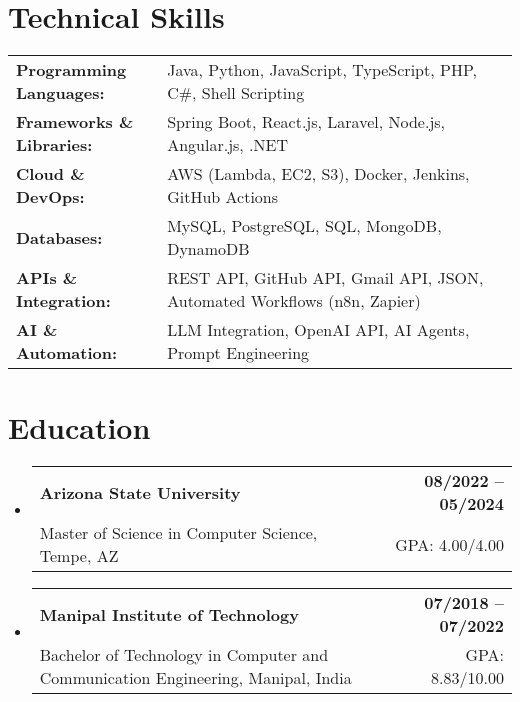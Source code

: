 \documentclass[letterpaper,11pt]{article}
\makeatletter
\newcommand{\educationSubheading}[4]{
  \vspace{-2pt}\item
    \begin{tabular*}{1.0\textwidth}[t]{l@{\extracolsep{\fill}}r}
      \textbf{\small #1} & \textbf{\small #2} \\
      {\small#3} & {\small #4} \\
    \end{tabular*}\vspace{-7pt}
}
\newcommand{\resumeSubHeadingListStart}{\begin{itemize}[leftmargin=0pt, label={}]}
\newcommand{\resumeSubHeadingListEnd}{\end{itemize}}
\makeatother
\begin{document}
\section{Technical Skills}
        \vspace{-14pt}
        \begin{table}[h]
            \footnotesize
            \begin{tabular}{p{0.3\linewidth} p{0.7\linewidth}}
                \textbf{Programming Languages:} & Java, Python, JavaScript, TypeScript, PHP, C\#, Shell Scripting \\
                \textbf{Frameworks \& Libraries:} & Spring Boot, React.js, Laravel, Node.js, Angular.js, .NET \\
                \textbf{Cloud \& DevOps:} & AWS (Lambda, EC2, S3), Docker, Jenkins, GitHub Actions \\
                \textbf{Databases:} & MySQL, PostgreSQL, SQL, MongoDB, DynamoDB \\
                \textbf{APIs \& Integration:} & REST API, GitHub API, Gmail API, JSON, Automated Workflows (n8n, Zapier) \\
                \textbf{AI \& Automation:} & LLM Integration, OpenAI API, AI Agents, Prompt Engineering \\
            \end{tabular}
        \end{table}

 \vspace{-15pt}

\section{Education}
  \resumeSubHeadingListStart
    \educationSubheading
      {Arizona State University}{08/2022 -- 05/2024}
      {Master of Science in Computer Science, Tempe, AZ}{GPA: 4.00/4.00}

    \educationSubheading
      {Manipal Institute of Technology}{07/2018 -- 07/2022}
      {Bachelor of Technology in Computer and Communication Engineering, Manipal, India}{GPA: 8.83/10.00}
  \resumeSubHeadingListEnd
\end{document}
